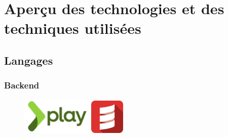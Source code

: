 \section{Aperçu des technologies et des techniques utilisées}

\subsection{Langages}
\label{sub:Langages}
\subsubsection{Backend}
\label{subs:Backend}
\begin{figure}[h]
  \begin{center}
    \includegraphics[width=0.3\textwidth]{Pictures/play_logo.png}
    \hspace{1in}
    \includegraphics[width=0.15\textwidth]{Pictures/scala_logo.png}
  \end{center}
\end{figure}


